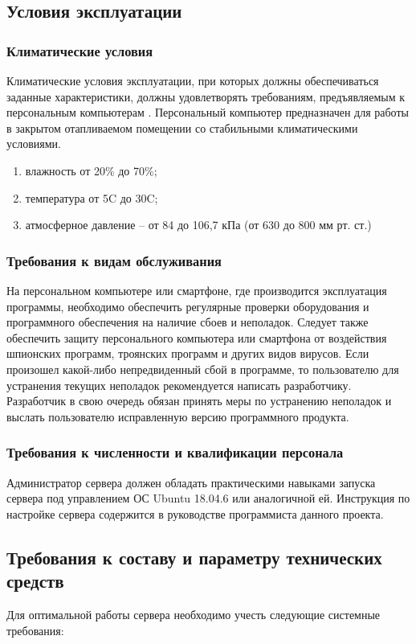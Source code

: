 \documentclass[a4paper,12pt,reqno]{article}
\begin{document}
  \subsection{Условия эксплуатации}
  \subsubsection{Климатические условия}
  Климатические условия эксплуатации, при которых должны обеспечиваться заданные характеристики, должны удовлетворять требованиям, предъявляемым к персональным компьютерам \cite{gostclimate}.
  Персональный компьютер предназначен для работы в закрытом отапливаемом помещении со стабильными климатическими условиями.
  \begin{enumerate}
    \item влажность от 20\% до 70\%;
    \item температура от 5\degree C до 30\degree C;
    \item атмосферное давление -- от 84 до 106,7 кПа (от 630 до 800 мм рт. ст.)
  \end{enumerate}


  \subsubsection{Требования к видам обслуживания}
  На персональном компьютере или смартфоне, где производится эксплуатация программы, необходимо обеспечить регулярные проверки оборудования и программного обеспечения на наличие сбоев и неполадок. Следует также обеспечить защиту персонального компьютера или смартфона от воздействия шпионских программ, троянских программ и других видов вирусов.
  Если произошел какой-либо непредвиденный сбой в программе, то пользователю для устранения текущих неполадок рекомендуется написать разработчику. Разработчик в свою очередь обязан принять меры по устранению неполадок и выслать пользователю исправленную версию программного продукта.

  \subsubsection{Требования к численности и квалификации персонала}
  Администратор сервера должен обладать практическими навыками запуска сервера под управлением ОС Ubuntu 18.04.6 или аналогичной ей.
  Инструкция по настройке сервера содержится в руководстве программиста данного проекта.

  \subsection{Требования к составу и параметру технических средств}
  Для оптимальной работы сервера необходимо учесть следующие системные требования:
\end{document}
